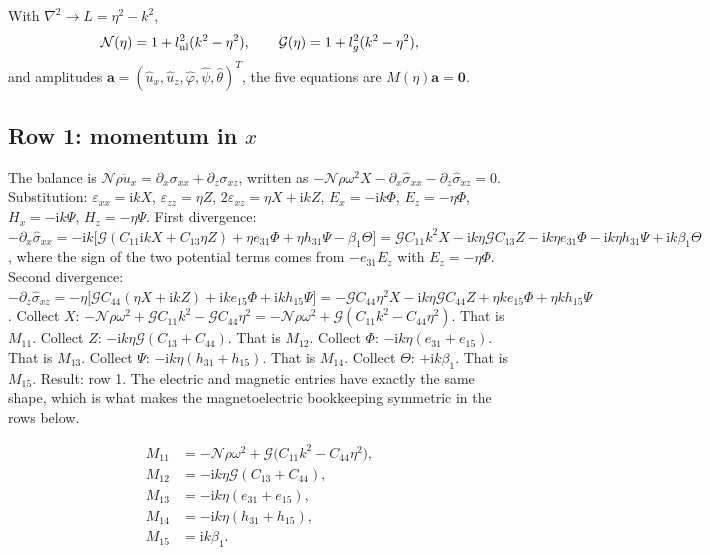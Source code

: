 \documentclass[11pt]{article}
\makeatletter
\newif\ifshowworked
\newenvironment{worked}{%
  \ifshowworked\par\smallskip\noindent\textit{Working.}\par\smallskip\else
  \setbox\z@\vbox\bgroup\fi}{\ifshowworked\par\smallskip\else\egroup\fi}
\newcommand{\ii}{\mathrm{i}}
\newcommand{\Ncal}{\mathcal{N}}
\newcommand{\Gcal}{\mathcal{G}}
\makeatother
\begin{document}
With $\nabla^2\to L=\eta^2-k^2$,
\begin{equation}
\Ncal(\eta)=1+l_{\rm nl}^2(k^2-\eta^2),\qquad \Gcal(\eta)=1+l_g^2(k^2-\eta^2),
\end{equation}
and amplitudes $\mathbf a=(\hat u_x,\hat u_z,\hat\varphi,\hat\psi,\hat\theta)^T$, the five equations are
$M(\eta)\mathbf a=\mathbf 0$.

\subsection*{Row 1: momentum in $x$}

\begin{worked}
The balance is $\Ncal\rho\ddot u_x=\partial_x\sigma_{xx}+\partial_z\sigma_{xz}$, written as
$-\Ncal\rho\omega^2X-\partial_x\hat\sigma_{xx}-\partial_z\hat\sigma_{xz}=0$.
Substitution: $\varepsilon_{xx}=\ii kX$, $\varepsilon_{zz}=\eta Z$, $2\varepsilon_{xz}=\eta X+\ii kZ$,
$E_x=-\ii k\Phi$, $E_z=-\eta\Phi$, $H_x=-\ii k\Psi$, $H_z=-\eta\Psi$.
First divergence: $-\partial_x\hat\sigma_{xx}
=-\ii k\bigl[\Gcal(C_{11}\ii kX+C_{13}\eta Z)+\eta e_{31}\Phi+\eta h_{31}\Psi-\beta_1\Theta\bigr]
=\Gcal C_{11}k^2X-\ii k\eta\Gcal C_{13}Z-\ii k\eta e_{31}\Phi-\ii k\eta h_{31}\Psi+\ii k\beta_1\Theta$,
where the sign of the two potential terms comes from $-e_{31}E_z$ with $E_z=-\eta\Phi$.
Second divergence: $-\partial_z\hat\sigma_{xz}
=-\eta\bigl[\Gcal C_{44}(\eta X+\ii kZ)+\ii ke_{15}\Phi+\ii kh_{15}\Psi\bigr]
=-\Gcal C_{44}\eta^2X-\ii k\eta\Gcal C_{44}Z+\eta ke_{15}\Phi+\eta kh_{15}\Psi$.
Collect $X$: $-\Ncal\rho\omega^2+\Gcal C_{11}k^2-\Gcal C_{44}\eta^2
=-\Ncal\rho\omega^2+\Gcal(C_{11}k^2-C_{44}\eta^2)$. That is $M_{11}$.
Collect $Z$: $-\ii k\eta\Gcal(C_{13}+C_{44})$. That is $M_{12}$.
Collect $\Phi$: $-\ii k\eta(e_{31}+e_{15})$. That is $M_{13}$.
Collect $\Psi$: $-\ii k\eta(h_{31}+h_{15})$. That is $M_{14}$.
Collect $\Theta$: $+\ii k\beta_1$. That is $M_{15}$.
Result: row 1. The electric and magnetic entries have exactly the same shape, which is what makes the
magnetoelectric bookkeeping symmetric in the rows below.
\end{worked}

\begin{align}
M_{11}&=-\Ncal\rho\omega^2+\Gcal\bigl(C_{11}k^2-C_{44}\eta^2\bigr), \\
M_{12}&=-\ii k\eta\Gcal(C_{13}+C_{44}), \\
M_{13}&=-\ii k\eta(e_{31}+e_{15}), \\
M_{14}&=-\ii k\eta(h_{31}+h_{15}), \\
M_{15}&=\ii k\beta_1 .
\end{align}
\end{document}
